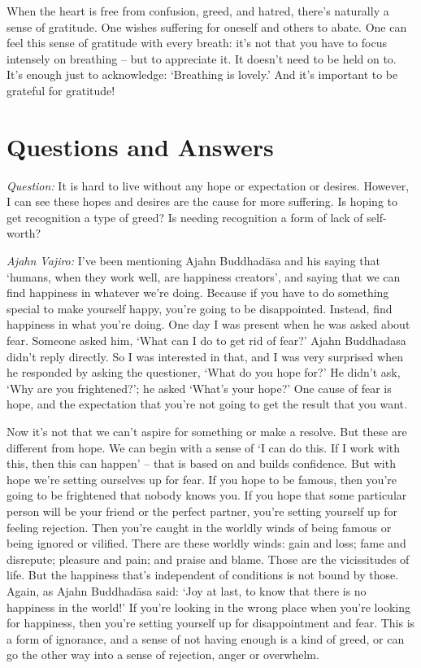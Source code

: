 When the heart is free from confusion, greed, and hatred, there's naturally a
sense of gratitude. One wishes suffering for oneself and others to abate. One
can feel this sense of gratitude with every breath: it's not that you have to
focus intensely on breathing -- but to appreciate it. It doesn't need to be held
on to. It's enough just to acknowledge: `Breathing is lovely.' And it's
important to be grateful for gratitude!

\section{Questions and Answers}

\emph{Question:} It is hard to live without any hope or expectation or desires.
However, I can see these hopes and desires are the cause for more suffering. Is
hoping to get recognition a type of greed? Is needing recognition a form of lack
of self-worth?

\enlargethispage{\baselineskip}

\emph{Ajahn Vajiro:} I've been mentioning Ajahn Buddhadāsa and his saying that `humans,
when they work well, are happiness creators', and saying that we can find
happiness in whatever we're doing. Because if you have to do something special
to make yourself happy, you're going to be disappointed. Instead, find happiness
in what you're doing. One day I was present when he was asked about fear.
Someone asked him, `What can I do to get rid of fear?' Ajahn Buddhadasa didn't
reply directly. So I was interested in that, and I was very surprised when he
responded by asking the questioner, `What do you hope for?' He didn't ask, `Why
are you frightened?'; he asked `What's your hope?' One cause of fear is hope, and
the expectation that you're not going to get the result that you want.

\enlargethispage{2\baselineskip}

Now it's not that we can't aspire for something or make a resolve. But these
are different from hope. We can begin with a sense of `I can do this. If I
work with this, then this can happen' -- that is based on and builds confidence. But with
hope we're setting ourselves up for fear. If you hope to be famous, then
you're going to be frightened that nobody knows you. If you hope that some
particular person will be your friend or the perfect partner, you're setting
yourself up for feeling rejection. Then you're caught in the worldly winds of
being famous or being ignored or vilified. There are these worldly winds: gain
and loss; fame and disrepute; pleasure and pain; and praise and blame. Those are
the vicissitudes of life. But the happiness that's independent of conditions is
not bound by those. Again, as Ajahn Buddhadāsa said: `Joy at last, to know that
there is no happiness in the world!' If you're looking in the wrong place when
you're looking for happiness, then you're setting yourself up for disappointment
and fear. This is a form of ignorance, and a sense of not having enough is a
kind of greed, or can go the other way into a sense of rejection, anger or
overwhelm.

